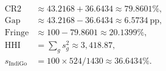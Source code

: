 \begin{align*}
\mathrm{CR2} &\approx 43.2168+36.6434 \approx 79.8601\%, \\
\mathrm{Gap} &\approx 43.2168-36.6434 \approx 6.5734\ \mathrm{pp}, \\
\mathrm{Fringe} &\approx 100-79.8601 \approx 20.1399\%, \\
\mathrm{HHI} &= \sum_g s_g^2 \approx 3,418.87, \\
s_{\mathrm{IndiGo}} &= 100\times524/1430 \approx 36.6434\%.
\end{align*}
